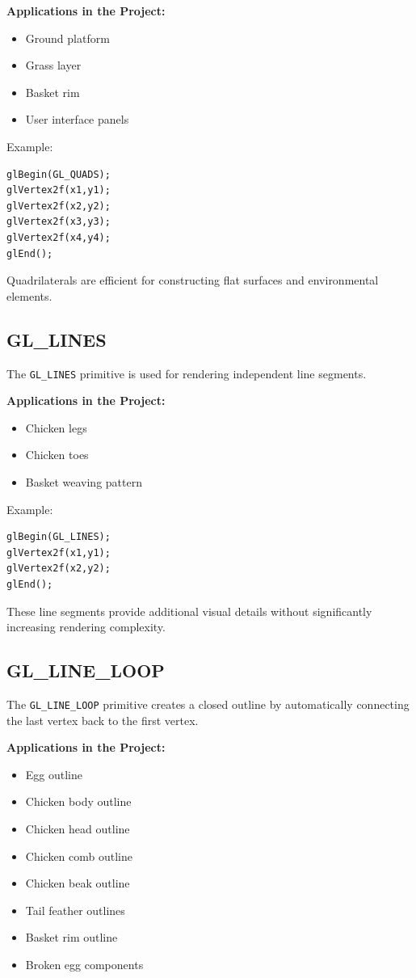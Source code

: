 \documentclass[12pt,a4paper]{report}
\begin{document}
\textbf{Applications in the Project:}

\begin{itemize}
\item Ground platform
\item Grass layer
\item Basket rim
\item User interface panels
\end{itemize}

Example:

\begin{verbatim}
glBegin(GL_QUADS);
glVertex2f(x1,y1);
glVertex2f(x2,y2);
glVertex2f(x3,y3);
glVertex2f(x4,y4);
glEnd();
\end{verbatim}

Quadrilaterals are efficient for constructing flat surfaces and environmental elements.

\subsection*{GL\_LINES}

The \texttt{GL\_LINES} primitive is used for rendering independent line segments.

\textbf{Applications in the Project:}

\begin{itemize}
\item Chicken legs
\item Chicken toes
\item Basket weaving pattern
\end{itemize}

Example:

\begin{verbatim}
glBegin(GL_LINES);
glVertex2f(x1,y1);
glVertex2f(x2,y2);
glEnd();
\end{verbatim}

These line segments provide additional visual details without significantly increasing rendering complexity.

\subsection*{GL\_LINE\_LOOP}

The \texttt{GL\_LINE\_LOOP} primitive creates a closed outline by automatically connecting the last vertex back to the first vertex.

\textbf{Applications in the Project:}

\begin{itemize}
\item Egg outline
\item Chicken body outline
\item Chicken head outline
\item Chicken comb outline
\item Chicken beak outline
\item Tail feather outlines
\item Basket rim outline
\item Broken egg components
\end{itemize}
\end{document}
